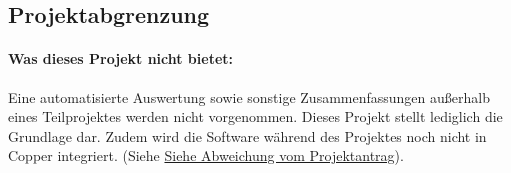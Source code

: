 \subsection{Projektabgrenzung} 
\label{sec:Projektabgrenzung}

\paragraph*{Was dieses Projekt nicht bietet: } Eine automatisierte Auswertung sowie sonstige Zusammenfassungen außerhalb eines Teilprojektes werden nicht vorgenommen. Dieses Projekt stellt lediglich die Grundlage dar. Zudem wird die Software während des Projektes noch nicht in Copper integriert. (Siehe  \hyperref[sec:AbweichungenProjektantrag]{Siehe Abweichung vom Projektantrag}).